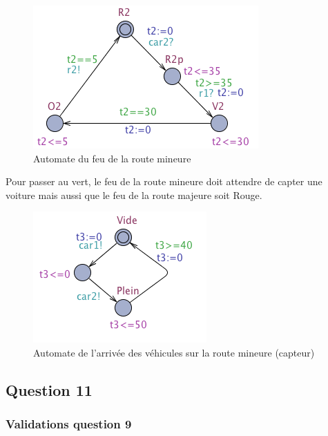 \documentclass[11pt]{article}
\begin{document}
\begin{figure}[H]
	\centering
	\includegraphics{ressources/part3/Q10-2.png}
	\caption{Automate du feu de la route mineure}
\end{figure}

Pour passer au vert, le feu de la route mineure doit attendre de capter une voiture mais aussi que le feu de la route majeure soit Rouge.

\begin{figure}[H]
	\centering
	\includegraphics{ressources/part3/Q10-3.png}
	\caption{Automate de l'arrivée des véhicules sur la route mineure (capteur)}
\end{figure}

\subsection{Question 11}

\subsubsection{Validations question 9}
\end{document}
